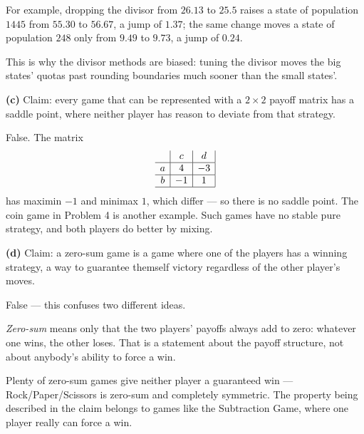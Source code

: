\documentclass[12pt]{ximera}
\begin{document}
\begin{problem}
\begin{prompt}
\begin{feedback}
For example, dropping the divisor from $26.13$ to $25.5$ raises a state of population
$1445$ from $55.30$ to $56.67$, a jump of $1.37$; the same change moves a state of
population $248$ only from $9.49$ to $9.73$, a jump of $0.24$.

This is why the divisor methods are biased: tuning the divisor moves the big states'
quotas past rounding boundaries much sooner than the small states'.
\end{feedback}
\end{prompt}

\begin{prompt}
\textbf{(c)} Claim: every game that can be represented with a $2\times 2$ payoff matrix
has a saddle point, where neither player has reason to deviate from that strategy.

\begin{multipleChoice}
\end{multipleChoice}

\begin{feedback}
False. The matrix
\[
\begin{array}{c|c|c|}
\phantom{|} & c & d \\\hline
a & 4 & -3 \\\hline
b & -1 & 1 \\\hline
\end{array}
\]
has maximin $-1$ and minimax $1$, which differ --- so there is no saddle point. The coin
game in Problem 4 is another example. Such games have no stable pure strategy, and both
players do better by mixing.
\end{feedback}
\end{prompt}

\begin{prompt}
\textbf{(d)} Claim: a zero-sum game is a game where one of the players has a winning
strategy, a way to guarantee themself victory regardless of the other player's moves.

\begin{multipleChoice}
\end{multipleChoice}

\begin{feedback}
False --- this confuses two different ideas.

\emph{Zero-sum} means only that the two players' payoffs always add to zero: whatever
one wins, the other loses. That is a statement about the payoff structure, not about
anybody's ability to force a win.

Plenty of zero-sum games give neither player a guaranteed win --- Rock/Paper/Scissors is
zero-sum and completely symmetric. The property being described in the claim belongs to
games like the Subtraction Game, where one player really can force a win.
\end{feedback}
\end{prompt}
\end{problem}
\end{document}
